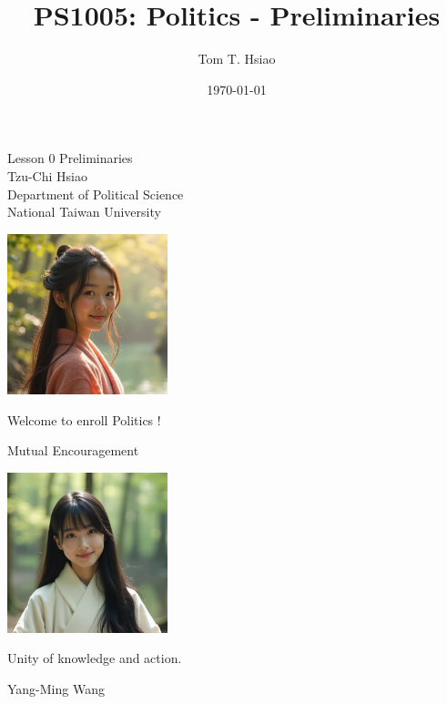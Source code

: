 \documentclass{beamer}
\title{PS1005: Politics - Preliminaries}
\author{Tom T. Hsiao}
\date{\today}
\begin{document}
\begin{frame}
\begin{center}
\Large{Lesson 0 Preliminaries} \\
\vspace{3em}
\normalsize{Tzu-Chi Hsiao} \\
\vspace{3em}
\small{Department of Political Science} \\
\vspace{1em}
\small{National Taiwan University} \\
\end{center}
\end{frame}
\begin{frame}{}
\begin{center}
\includegraphics[width=0.35\textwidth]{instructor.png}
\end{center}
\vspace{1em}
\begin{center}
\large{Welcome to enroll Politics !} \\
\end{center}
\end{frame}
\begin{frame}{Mutual Encouragement}
\begin{center}
\includegraphics[width=0.35\textwidth]{mc.png}
\end{center}
\begin{center}
Unity of knowledge and action.
\end{center}
\flushright Yang-Ming Wang
\end{frame}
\end{document}
